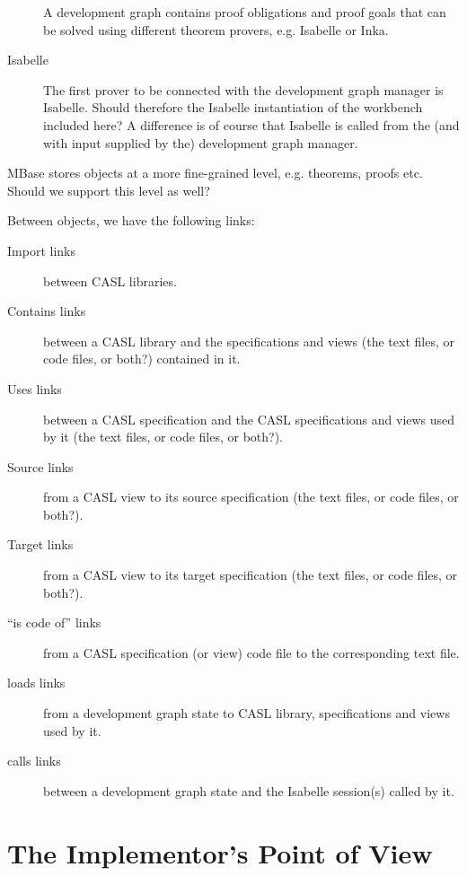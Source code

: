 \documentclass[a4paper]{article}
\begin{document}
\begin{description}
A development graph contains proof obligations
and proof goals that can be solved using different
theorem provers, e.g. Isabelle or Inka.

\item[Isabelle]
The first prover to be connected with the development
graph manager is Isabelle. Should therefore the
Isabelle instantiation of the workbench included here?
A difference is of course that Isabelle is called
from the (and with input supplied by the)
development graph manager.
\end{description}

MBase stores objects at a more fine-grained level,
e.g. theorems, proofs etc. Should we support this level
as well?

Between objects, we have the following links:

\begin{description}
\item[Import links]
between CASL libraries.

\item[Contains links] between a CASL library
and the specifications and views (the text files,
or code files, or both?)
contained in it.

\item[Uses links] between a CASL specification
and the CASL specifications and views used by it
(the text files, or code files, or both?).

\item[Source links] from a CASL view to its
source specification (the text files,
or code files, or both?).

\item[Target links] from a CASL view to its
target specification (the text files,
or code files, or both?).

\item[``is code of'' links] from a CASL
specification (or view) code file to the
corresponding text file.

\item[loads links] from a development
graph state to CASL library, specifications
and views used by it.

\item[calls links] between a development
graph state and the Isabelle session(s) called
by it.

\end{description}


\section{The Implementor's Point of View}
\end{document}
